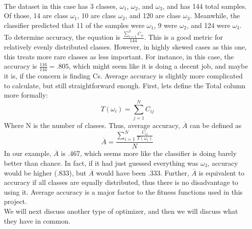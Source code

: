 \\The dataset in this case has 3 classes, $\omega_1$, $\omega_2$, and $\omega_3$, and has 144 total samples.  Of those, 14 are class $\omega_1$, 10 are class $\omega_2$, and 120 are class $\omega_3$.  Meanwhile, the classifier predicted that 11 of the samples were $\omega_1$, 9 were $\omega_2$, and 124 were $\omega_3$.  To determine accuracy, the equation is $\frac{\sum_{i=1}^{3}C_{ii}}{144}$.  This is a good metric for relatively evenly distributed classes.  However, in highly skewed cases as this one, this treats more rare classes as less important.  For instance, in this case, the accuracy is $\frac{116}{144} = .805$, which might seem like it is doing a decent job, and maybe it is, if the concern is finding Cs.  Average accuracy is slightly more complicated to calculate, but still straightforward enough.  First, lets define the Total column more formally: $$T(\omega_i)=\sum_{j=1}^{N}C_{ij}$$
Where N is the number of classes.  Thus, average accuracy, $\overline{A}$ can be defined as $$\overline{A} = \frac{\sum_{i=1}^{N}\frac{C_{ii}}{T(\omega_i)}} {N}$$
In our example, $\overline{A}$ is .467, which seems more like the classifier is doing barely better than chance.  In fact, if it had just guessed everything was $\omega_3$, accuracy would be higher (.833), but $\overline{A}$ would have been .333.  Further, $\overline{A}$ is equivalent to accuracy if all classes are equally distributed, thus there is no disadvantage to using it.  Average accuracy is a major factor to the fitness functions used in this project.\\
We will next discuss another type of optimizer, and then we will discuss what they have in common.

